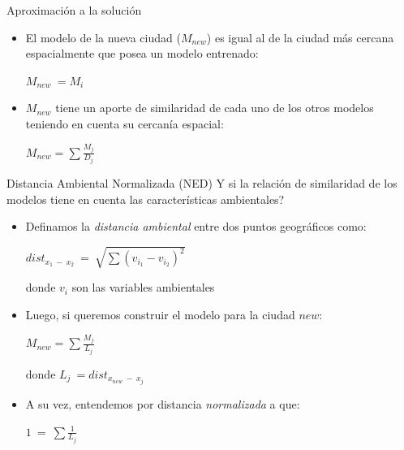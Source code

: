 \documentclass[10pt]{beamer}
\begin{document}
\begin{frame}{Aproximación a la solución}
  \begin{itemize}[<+->]
    \item El modelo de la nueva ciudad ($M_{new}$) es igual al de la ciudad más
          cercana espacialmente que posea un modelo entrenado:
          \begin{center}
            $M_{new}\ = M_{i}$
          \end{center}
    \item $M_{new}$ tiene un aporte de similaridad de cada uno de los otros modelos
          teniendo en cuenta su cercanía espacial:
          \begin{center}
            $M_{new} = \sum{}{\frac{M_{j}}{D_{j}}}$
          \end{center}
  \end{itemize}
\end{frame}

\begin{frame}{Distancia Ambiental Normalizada (NED)}
  Y si la relación de similaridad de los modelos tiene en cuenta las características
  ambientales?
  \pause
  \begin{itemize}[<+->]
    \item Definamos la \textit{distancia ambiental} entre dos puntos geográficos como:
      \begin{center}
        $dist_{x_{1}\ -\ x_{2}} \ =\ \sqrt{\sum{}{(v_{i_{1}} - v_{i_{2}})^{2}}}$
      \end{center}
      donde $v_{i}$ son las variables ambientales

    \item Luego, si queremos construir el modelo para la ciudad $new$:
      \begin{center}
        $M_{new} = \sum{}{\frac{M_{j}}{L_{j}}}$
      \end{center}
      donde $L_{j}\ = dist_{x_{new}\ -\ x_{j}}$
    \item A su vez, entendemos por distancia \textit{normalizada} a que:
    \begin{center}
      $1\ =\ \sum{}{\frac{1}{L_{j}}}$
    \end{center}

  \end{itemize}
\end{frame}
\end{document}
